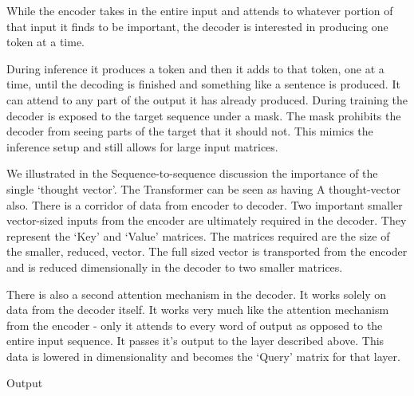 While the encoder takes in the entire input and attends to whatever portion of that input it finds to be important, the decoder is interested in producing one token at a time. 

During inference it produces a token and then it adds to that token, one at a time, until the decoding is finished and something like a sentence is produced. It can attend to any part of the output it has already produced. During training the decoder is exposed to the target sequence under a mask. The mask prohibits the decoder from seeing parts of the target that it should not. This mimics the inference setup and still allows for large input matrices.

We illustrated in the Sequence-to-sequence discussion the importance of the single `thought vector'. The Transformer can be seen as having A thought-vector also. There is a corridor of data from encoder to decoder. Two important smaller vector-sized inputs from the encoder are ultimately required in the decoder. They represent the `Key' and `Value' matrices. The matrices required are the size of the smaller, reduced, vector. The full sized vector is transported from the encoder and is reduced dimensionally in the decoder to two smaller matrices.

There is also a second attention mechanism in the decoder. It works solely on data from the decoder itself. It works very much like the attention mechanism from the encoder - only it attends to every word of output as opposed to the entire input sequence. It passes it's output to the layer described above. This data is lowered in dimensionality and becomes the `Query' matrix for that layer.

Output




